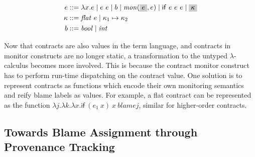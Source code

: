 \documentclass[acmsmall]{acmart}
\newcommand{\highlight}[1]{\colorbox{light-gray}{$#1$}}
\begin{document}
\begin{align*}
   e &::= \lambda x . e \mid e~e \mid b \mid \mathit{mon}(\highlight{e}, e) \mid \mathsf{if}~e~e~e \mid \highlight{\kappa} \\
   \kappa &::= \mathit{flat}~e \mid \kappa_1 \mapsto \kappa_2 \\
   b &::= \mathit{bool} \mid \mathit{int}
\end{align*}

Now that contracts are also values in the term language, and contracts in monitor constructs are no longer static, a transformation to the untyped $\lambda$-calculus becomes more involved.
This is because the contract monitor construct has to perform run-time dispatching on the contract value.
One solution is to represent contracts as functions which encode their own monitoring semantics and reify blame labels as values.
For example, a flat contract can be represented as the function $\lambda j.\lambda k.\lambda x . \mathsf{if}~(e_1~x)~x~blame j$, similar for higher-order contracts.


\subsection{Towards Blame Assignment through Provenance Tracking}






\end{document}
